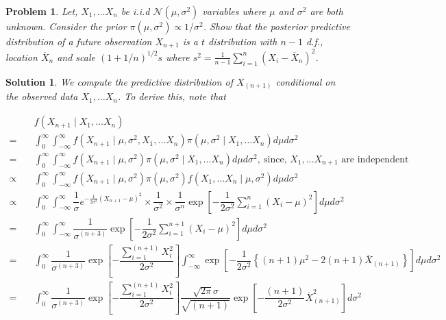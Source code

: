 \documentclass[12pt]{article}
\theoremstyle{problemstyle}
\newtheorem{pbm}{Problem}
\newtheorem*{solution*}{Solution}
\newenvironment{problem}{
\begin{tcolorbox}[colback=green!10!white,colframe=black!75!black, parbox = false]\begin{pbm} }{\end{pbm}\end{tcolorbox} }
\newcommand{\normal}{\mathcal{N}}
\begin{document}
\begin{problem}
    Let, $X_1, \dots X_n$ be i.i.d $\normal(\mu, \sigma^2)$ variables where $\mu$ and $\sigma^2$ are both unknown. Consider the prior $\pi(\mu, \sigma^2) \propto 1/\sigma^2$. Show that the posterior predictive distribution of a future observation $X_{n+1}$ is a $t$ distribution with $n-1$ d.f., location $\overline{X}_n$ and scale $(1+1/n)^{1/2}s$ where $s^2 = \frac{1}{n-1}\sum_{i=1}^n (X_i - \overline{X}_n)^2$.
\end{problem}
\begin{solution*}
    We compute the predictive distribution of $X_{(n+1)}$ conditional on the observed data $X_1, \dots X_n$. To derive this, note that 

    \begingroup
    \allowdisplaybreaks
    \begin{align*}
        & f(X_{n+1} \mid X_1, \dots X_n)\\
        = \quad & \int_{0}^\infty \int_{-\infty}^\infty f(X_{n+1} \mid \mu, \sigma^2, X_1, \dots X_n) \pi(\mu, \sigma^2 \mid X_1, \dots X_n) d\mu d\sigma^2\\
        = \quad &  \int_{0}^\infty \int_{-\infty}^\infty f(X_{n+1} \mid \mu, \sigma^2) \pi(\mu, \sigma^2 \mid X_1, \dots X_n) d\mu d\sigma^2, \ \text{since, } X_1, \dots X_{n+1}\text{ are independent}\\
        \propto \quad & \int_{0}^\infty \int_{-\infty}^\infty f(X_{n+1} \mid \mu, \sigma^2) \pi(\mu, \sigma^2) f(X_1, \dots X_n \mid \mu, \sigma^2) d\mu d\sigma^2\\
        \propto \quad &  \int_{0}^\infty \int_{-\infty}^\infty \dfrac{1}{\sigma} e^{-\frac{1}{2\sigma^2}(X_{n+1}-\mu)^2} \times \dfrac{1}{\sigma^2} \times \dfrac{1}{\sigma^{n}} \exp\left[ -\dfrac{1}{2\sigma^2}\sum_{i=1}^{n} (X_i - \mu)^2 \right] d\mu d\sigma^2\\
        = \quad & \int_{0}^\infty \int_{-\infty}^\infty \dfrac{1}{\sigma^{(n+3)}} \exp\left[ -\dfrac{1}{2\sigma^2}\sum_{i=1}^{n+1} (X_i - \mu)^2 \right] d\mu d\sigma^2\\
        = \quad & \int_{0}^\infty \dfrac{1}{\sigma^{(n+3)}} \exp\left[ -\dfrac{\sum_{i=1}^{(n+1)}X_i^2}{2\sigma^2} \right] \int_{-\infty}^\infty \exp\left[ -\dfrac{1}{2\sigma^2}\left\{ (n+1)\mu^2 - 2(n+1)\overline{X}_{(n+1)} \right\} \right] d\mu d\sigma^2\\
        = \quad & \int_{0}^\infty \dfrac{1}{\sigma^{(n+3)}} \exp\left[ -\dfrac{\sum_{i=1}^{(n+1)}X_i^2}{2\sigma^2} \right] \dfrac{\sqrt{2\pi}\sigma}{\sqrt{(n+1)}} \exp\left[ -\dfrac{(n+1)}{2\sigma^2} \overline{X}_{(n+1)}^2 \right] d\sigma^2\\

\end{align*}
\end{solution*}
\end{document}
